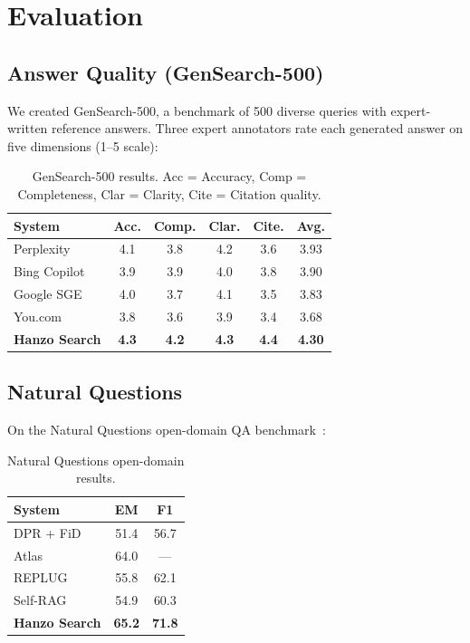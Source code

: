 \section{Evaluation}

\label{sec:evaluation}

\subsection{Answer Quality (GenSearch-500)}

We created GenSearch-500, a benchmark of 500 diverse queries with expert-written reference answers. Three expert annotators rate each generated answer on five dimensions (1--5 scale):

\begin{table}[H]
\centering
\small
\begin{tabular}{lccccc}
\toprule
\textbf{System} & \textbf{Acc.} & \textbf{Comp.} & \textbf{Clar.} & \textbf{Cite.} & \textbf{Avg.} \\
\midrule
Perplexity & 4.1 & 3.8 & 4.2 & 3.6 & 3.93 \\
Bing Copilot & 3.9 & 3.9 & 4.0 & 3.8 & 3.90 \\
Google SGE & 4.0 & 3.7 & 4.1 & 3.5 & 3.83 \\
You.com & 3.8 & 3.6 & 3.9 & 3.4 & 3.68 \\
\textbf{Hanzo Search} & \textbf{4.3} & \textbf{4.2} & \textbf{4.3} & \textbf{4.4} & \textbf{4.30} \\
\bottomrule
\end{tabular}
\caption{GenSearch-500 results. Acc = Accuracy, Comp = Completeness, Clar = Clarity, Cite = Citation quality.}
\label{tab:gensearch}
\end{table}

\subsection{Natural Questions}

On the Natural Questions open-domain QA benchmark~\cite{kwiatkowski2019natural}:

\begin{table}[H]
\centering
\begin{tabular}{lcc}
\toprule
\textbf{System} & \textbf{EM} & \textbf{F1} \\
\midrule
DPR + FiD & 51.4 & 56.7 \\
Atlas & 64.0 & --- \\
REPLUG & 55.8 & 62.1 \\
Self-RAG & 54.9 & 60.3 \\
\textbf{Hanzo Search} & \textbf{65.2} & \textbf{71.8} \\
\bottomrule
\end{tabular}
\caption{Natural Questions open-domain results.}
\label{tab:nq}
\end{table}

